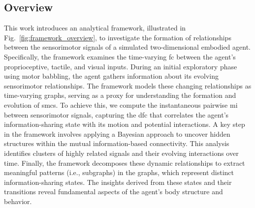 \subsection{Overview}
This work introduces an analytical framework, illustrated in Fig.~\ref{fig:framework_overview}, to investigate the formation of relationships between the sensorimotor signals of a simulated two-dimensional embodied agent. Specifically, the framework examines the time-varying \acl{fc} between the agent's proprioceptive, tactile, and visual inputs. During an initial exploratory phase using motor babbling, the agent gathers information about its evolving sensorimotor relationships. The framework models these changing relationships as time-varying graphs, serving as a proxy for understanding the formation and evolution of \acp{smc}. To achieve this, we compute the instantaneous pairwise \ac{mi} between sensorimotor signals, capturing the \acl{dfc} that correlates the agent’s information-sharing state with its motion and potential interactions. A key step in the framework involves applying a Bayesian approach to uncover hidden structures within the mutual information-based connectivity. This analysis identifies clusters of highly related signals and their evolving interactions over time. Finally, the framework decomposes these dynamic relationships to extract meaningful patterns (i.e., subgraphs) in the graphs, which represent distinct information-sharing states. The insights derived from these states and their transitions reveal fundamental aspects of the agent’s body structure and behavior.
